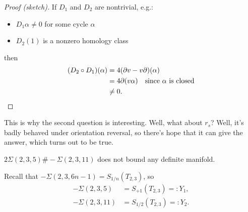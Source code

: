 \documentclass[main]{subfiles}
\begin{document}
\begin{proof}[Proof (sketch)]
If $D_1$ and $D_2$ are nontrivial, e.g.:
\begin{itemize}
\item $D_1\alpha\neq 0$ for some cycle $\alpha$
\item $D_2(1)$ is a nonzero homology class
\end{itemize}
then
\begin{align*}
(D_2\circ D_1)(\alpha) &= 4(\partial v-v\partial)(\alpha)\\
&= 4\partial(v\alpha) \quad\text{since $\alpha$ is closed}\\
&\neq 0. \qedhere
\end{align*}
\end{proof}

This is why the second question is interesting. Well, what about $r_s$? Well, it's badly behaved under orientation reversal, so there's hope that it can give the answer, which turns out to be true.

\begin{theorem}[NST]
$2\Sigma(2,3,5)\#-\Sigma(2,3,11)$ does not bound any definite manifold.
\end{theorem}

Recall that $-\Sigma(2,3,6n-1)=S_{1/n}(T_{2,3})$, so
\begin{align*}
-\Sigma(2,3,5) &= S_{+1}(T_{2,3}) =: Y_1,\\
-\Sigma(2,3,11) &= S_{1/2}(T_{2,3}) =: Y_2.
\end{align*}
\end{document}
